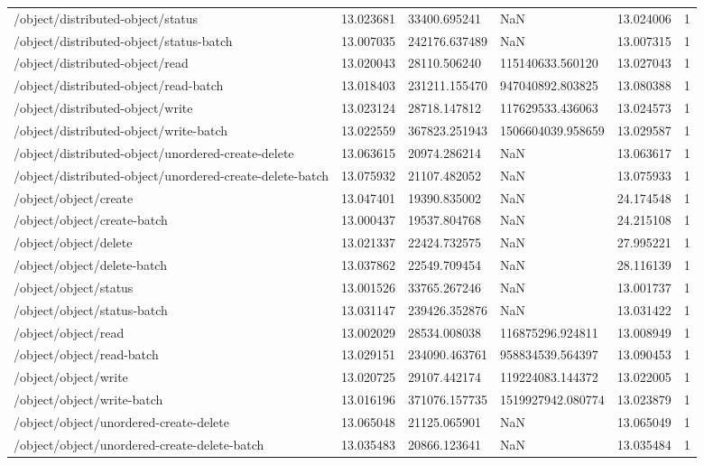 \begin{tabularx}{\linewidth}{XXXXXX}
/object/distributed-object/status & 13.023681 & 33400.695241 & NaN & 13.024006 & 1 \\
/object/distributed-object/status-batch & 13.007035 & 242176.637489 & NaN & 13.007315 & 1 \\
/object/distributed-object/read & 13.020043 & 28110.506240 & 115140633.560120 & 13.027043 & 1 \\
/object/distributed-object/read-batch & 13.018403 & 231211.155470 & 947040892.803825 & 13.080388 & 1 \\
/object/distributed-object/write & 13.023124 & 28718.147812 & 117629533.436063 & 13.024573 & 1 \\
/object/distributed-object/write-batch & 13.022559 & 367823.251943 & 1506604039.958659 & 13.029587 & 1 \\
/object/distributed-object/unordered-create-delete & 13.063615 & 20974.286214 & NaN & 13.063617 & 1 \\
/object/distributed-object/unordered-create-delete-batch & 13.075932 & 21107.482052 & NaN & 13.075933 & 1 \\
/object/object/create & 13.047401 & 19390.835002 & NaN & 24.174548 & 1 \\
/object/object/create-batch & 13.000437 & 19537.804768 & NaN & 24.215108 & 1 \\
/object/object/delete & 13.021337 & 22424.732575 & NaN & 27.995221 & 1 \\
/object/object/delete-batch & 13.037862 & 22549.709454 & NaN & 28.116139 & 1 \\
/object/object/status & 13.001526 & 33765.267246 & NaN & 13.001737 & 1 \\
/object/object/status-batch & 13.031147 & 239426.352876 & NaN & 13.031422 & 1 \\
/object/object/read & 13.002029 & 28534.008038 & 116875296.924811 & 13.008949 & 1 \\
/object/object/read-batch & 13.029151 & 234090.463761 & 958834539.564397 & 13.090453 & 1 \\
/object/object/write & 13.020725 & 29107.442174 & 119224083.144372 & 13.022005 & 1 \\
/object/object/write-batch & 13.016196 & 371076.157735 & 1519927942.080774 & 13.023879 & 1 \\
/object/object/unordered-create-delete & 13.065048 & 21125.065901 & NaN & 13.065049 & 1 \\
/object/object/unordered-create-delete-batch & 13.035483 & 20866.123641 & NaN & 13.035484 & 1 \\

\end{tabularx}
